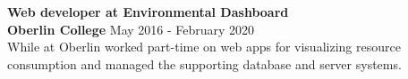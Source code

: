 \documentclass[margin]{res}
\newcommand\rurl[1]{%
  \href{http://#1}{\nolinkurl{#1}}%
}
\begin{document}
\begin{resume}
\textbf{Web developer at Environmental Dashboard}\\
\textbf{Oberlin College} \hfill        May 2016 - February 2020\\
While at Oberlin worked part-time on web apps for visualizing resource consumption and managed the supporting database and server systems.



\end{resume}
\end{document}
